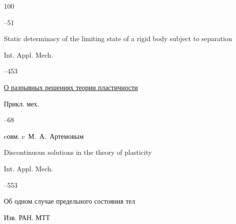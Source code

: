 \begin{thebibliography}{100}



–51



\transl



\paper Static determinacy of the limiting state of a rigid body subject to separation

\jour Int. Appl. Mech. 



--453 






\paper \href{https://zbmath.org/?q=an:0924.73079}{О разрывных решениях теории пластичности}

\jour Прикл. мех.




–68 

\miscnote cовм. c~М.~А.~Артемовым


\transl



\paper Discontinuous solutions in the theory of plasticity

\jour Int. Appl. Mech. 



--553 






\paper Об одном случае предельного состояния тел 

\jour Изв. РАН. МТТ


\end{thebibliography}
